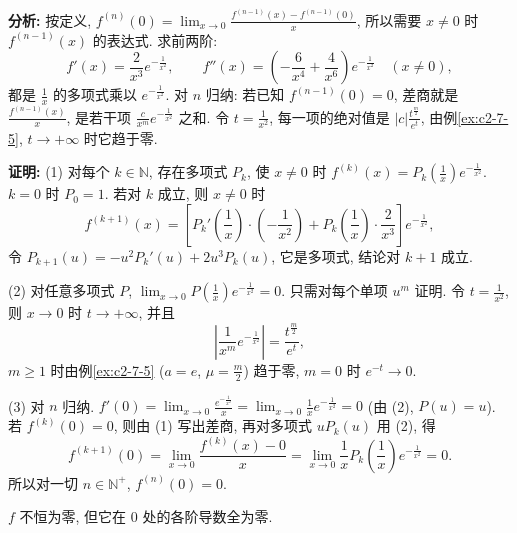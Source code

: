 \documentclass[UTF8,openany]{ctexbook}
\theoremstyle{chinesetextbook}
\newenvironment{cnproof}{\par\indent\textbf{证明:} \ignorespaces}{\par}
\begin{document}
\par\indent\textbf{分析:} 按定义, $\displaystyle f^{(n)}(0)=\lim_{x\to0}\frac{f^{(n-1)}(x)-f^{(n-1)}(0)}x$, 所以需要 $x\ne0$ 时 $f^{(n-1)}(x)$ 的表达式. 求前两阶:
\[
f'(x)=\frac2{x^3}e^{-\frac1{x^2}},\qquad f''(x)=\left(-\frac6{x^4}+\frac4{x^6}\right)e^{-\frac1{x^2}}\quad(x\ne0),
\]
都是 $\displaystyle\frac1x$ 的多项式乘以 $e^{-\frac1{x^2}}$. 对 $n$ 归纳: 若已知 $f^{(n-1)}(0)=0$, 差商就是 $\displaystyle\frac{f^{(n-1)}(x)}x$, 是若干项 $\displaystyle\frac c{x^m}e^{-\frac1{x^2}}$ 之和. 令 $\displaystyle t=\frac1{x^2}$, 每一项的绝对值是 $\displaystyle|c|\frac{t^{\frac m2}}{e^t}$, 由例\ref{ex:c2-7-5}, $t\to+\infty$ 时它趋于零.
\begin{cnproof}
(1) 对每个 $k\in\mathbb N$, 存在多项式 $P_k$, 使 $x\ne0$ 时 $\displaystyle f^{(k)}(x)=P_k\left(\frac1x\right)e^{-\frac1{x^2}}$. $k=0$ 时 $P_0=1$. 若对 $k$ 成立, 则 $x\ne0$ 时
\[
f^{(k+1)}(x)=\left[P_k'\left(\frac1x\right)\cdot\left(-\frac1{x^2}\right)+P_k\left(\frac1x\right)\cdot\frac2{x^3}\right]e^{-\frac1{x^2}},
\]
令 $P_{k+1}(u)=-u^2P_k'(u)+2u^3P_k(u)$, 它是多项式, 结论对 $k+1$ 成立.

(2) 对任意多项式 $P$, $\displaystyle\lim_{x\to0}P\left(\frac1x\right)e^{-\frac1{x^2}}=0$. 只需对每个单项 $u^m$ 证明. 令 $\displaystyle t=\frac1{x^2}$, 则 $x\to0$ 时 $t\to+\infty$, 并且
\[
\left|\frac1{x^m}e^{-\frac1{x^2}}\right|=\frac{t^{\frac m2}}{e^t},
\]
$m\ge1$ 时由例\ref{ex:c2-7-5} ($a=e$, $\displaystyle\mu=\frac m2$) 趋于零, $m=0$ 时 $e^{-t}\to0$.

(3) 对 $n$ 归纳. $\displaystyle f'(0)=\lim_{x\to0}\frac{e^{-\frac1{x^2}}}x=\lim_{x\to0}\frac1xe^{-\frac1{x^2}}=0$ (由 (2), $P(u)=u$). 若 $f^{(k)}(0)=0$, 则由 (1) 写出差商, 再对多项式 $uP_k(u)$ 用 (2), 得
\[
f^{(k+1)}(0)=\lim_{x\to0}\frac{f^{(k)}(x)-0}x=\lim_{x\to0}\frac1xP_k\left(\frac1x\right)e^{-\frac1{x^2}}=0.
\]
所以对一切 $n\in\mathbb N^+$, $f^{(n)}(0)=0$.
\end{cnproof}
$f$ 不恒为零, 但它在 $0$ 处的各阶导数全为零.
\end{document}
